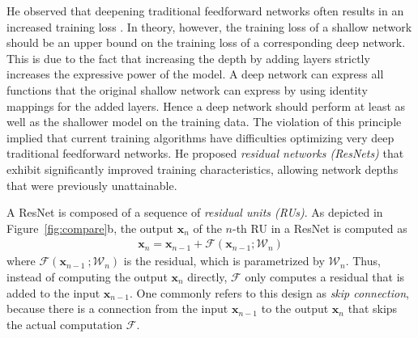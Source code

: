\documentclass[10pt,twocolumn,letterpaper]{article}
\newcommand{\bx}{\mathbf{x}}
\newcommand{\PAR}[1]{\vskip4pt \noindent {\bf #1~}}
\begin{document}
\PAR{Residual Networks (ResNets).}
He \etal observed that deepening traditional feedforward networks often results in an increased training loss \cite{He16CVPR}.
In theory, however, the training loss of a shallow network should be an upper bound on the training loss of a corresponding deep network.
This is due to the fact that increasing the depth by adding layers strictly increases the expressive power of the model.
A deep network can express all functions that the original shallow network can express by using identity mappings for the added layers.
Hence a deep network should perform at least as well as the shallower model on the training data.
The violation of this principle implied that current training algorithms have difficulties optimizing very deep traditional feedforward networks.
He \etal proposed \emph{residual networks (ResNets)} that exhibit significantly improved training characteristics, allowing network depths that were previously unattainable.

A ResNet is composed of a sequence of \emph{residual units (RUs)}.
As depicted in Figure~\ref{fig:compare}b, the output $\bx_{n}$ of the $n$-th RU in a ResNet is computed as
\begin{align}
	\bx_{n} = \bx_{n - 1} + \mathcal{F}(\bx_{n-1}; \mathcal{W}_n) \label{eq:resnet}
\end{align}
where $\mathcal{F}( \bx_{n-1} \ ; \mathcal{W}_n)$ is the residual, which is parametrized by $\mathcal{W}_n$.
Thus, instead of computing the output $\bx_{n}$ directly, $\mathcal{F}$ only computes a residual that is added to the input $\bx_{n-1}$.
One commonly refers to this design as \emph{skip connection}, because there is a connection from the input $\bx_{n-1}$ to the output $\bx_{n}$ that skips the actual computation $\mathcal{F}$.
\end{document}
